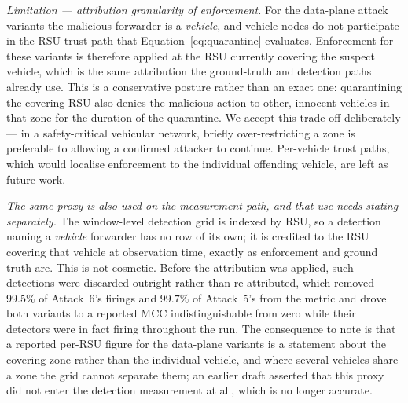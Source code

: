 \documentclass[12pt, a4paper]{report}
\begin{document}
{\textit{Limitation --- attribution granularity of enforcement.} For the
data-plane attack variants the malicious forwarder is a \emph{vehicle},
and vehicle nodes do not participate in the \ac{RSU} trust path that
Equation~\eqref{eq:quarantine} evaluates. Enforcement for these variants
is therefore applied at the \ac{RSU} currently covering the suspect
vehicle, which is the same attribution the ground-truth and detection
paths already use. This is a conservative posture rather than an exact
one: quarantining the covering \ac{RSU} also denies the malicious action
to other, innocent vehicles in that zone for the duration of the
quarantine. We accept this trade-off deliberately --- in a
safety-critical vehicular network, briefly over-restricting a zone is
preferable to allowing a confirmed attacker to continue. Per-vehicle trust
paths, which would localise enforcement to the individual offending
vehicle, are left as future work.

\textit{The same proxy is also used on the measurement path, and that use
needs stating separately.} The window-level detection grid is indexed by
\ac{RSU}, so a detection naming a \emph{vehicle} forwarder has no row of its
own; it is credited to the \ac{RSU} covering that vehicle at observation
time, exactly as enforcement and ground truth are. This is not cosmetic. Before
the attribution was applied, such detections were discarded outright rather
than re-attributed, which removed $99.5\%$ of Attack~6's firings and $99.7\%$
of Attack~5's from the metric and drove both variants to a reported \ac{MCC}
indistinguishable from zero while their detectors were in fact firing
throughout the run. The consequence to note is that a reported per-\ac{RSU}
figure for the data-plane variants is a statement about the covering zone
rather than the individual vehicle, and where several vehicles share a zone the
grid cannot separate them; an earlier draft asserted that this proxy did not
enter the detection measurement at all, which is no longer accurate.

}
\end{document}
